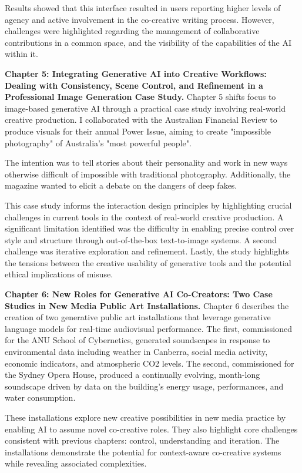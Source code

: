 Results showed that this interface resulted in users reporting higher levels of agency and active involvement in the co-creative writing process. However, challenges were highlighted regarding the management of collaborative contributions in a common space, and the visibility of the capabilities of the AI within it. 

\textbf{Chapter 5: Integrating Generative AI into Creative Workflows: Dealing with Consistency, Scene Control, and Refinement in a Professional Image Generation Case Study.} Chapter 5 shifts focus to image-based generative AI through a practical case study involving real-world creative production. I collaborated with the Australian Financial Review to produce visuals for their annual Power Issue, aiming to create "impossible photography" of Australia's "most powerful people".

The intention was to tell stories about their personality and work in new ways otherwise difficult of impossible with traditional photography. Additionally, the magazine wanted to elicit a debate on the dangers of deep fakes. 

This case study informs the interaction design principles by highlighting crucial challenges in current tools in the context of real-world creative production. A significant limitation identified was the difficulty in enabling precise control over style and structure through out-of-the-box text-to-image systems. A second challenge was iterative exploration and refinement. Lastly, the study highlights the tensions between the creative usability of generative tools and the potential ethical implications of misuse. 

\textbf{Chapter 6: New Roles for Generative AI Co-Creators: Two Case Studies in New Media Public Art Installations.} Chapter 6 describes the creation of two generative public art installations that leverage generative language models for real-time audiovisual performance. The first, commissioned for the ANU School of Cybernetics, generated soundscapes in response to environmental data including weather in Canberra, social media activity, economic indicators, and atmospheric CO2 levels. The second, commissioned for the Sydney Opera House, produced a continually evolving, month-long soundscape driven by data on the building's energy usage, performances, and water consumption.

These installations explore new creative possibilities in new media practice by enabling AI to assume novel co-creative roles. They also highlight core challenges consistent with previous chapters: control, understanding and iteration. The installations demonstrate the potential for context-aware co-creative systems while revealing associated complexities. 

